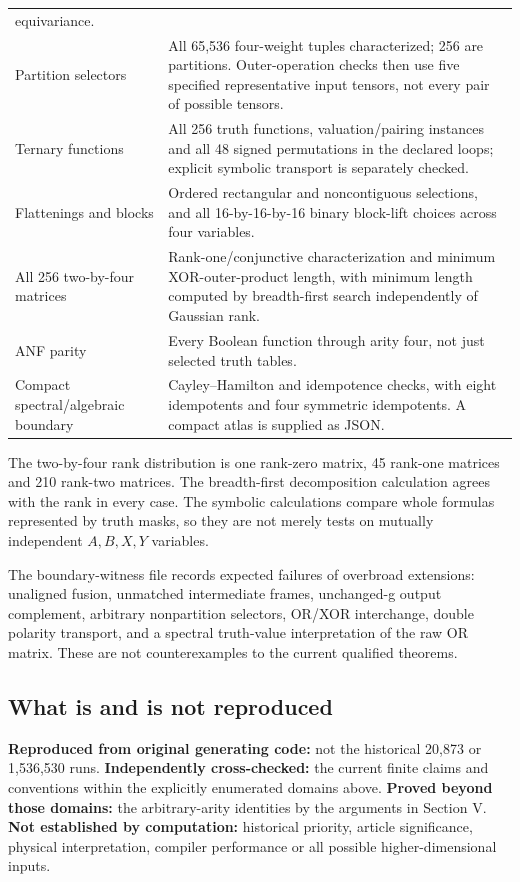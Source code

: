 \documentclass[
  10pt,
]{article}
\begin{document}
\begin{longtable}[]{@{}
  >{\raggedright\arraybackslash}p{}
  >{\raggedright\arraybackslash}p{}@{}}
equivariance. \\
Partition selectors & All 65,536 four-weight tuples characterized; 256
are partitions. Outer-operation checks then use five specified
representative input tensors, not every pair of possible tensors. \\
Ternary functions & All 256 truth functions, valuation/pairing instances
and all 48 signed permutations in the declared loops; explicit symbolic
transport is separately checked. \\
Flattenings and blocks & Ordered rectangular and noncontiguous
selections, and all 16-by-16-by-16 binary block-lift choices across four
variables. \\
All 256 two-by-four matrices & Rank-one/conjunctive characterization and
minimum XOR-outer-product length, with minimum length computed by
breadth-first search independently of Gaussian rank. \\
ANF parity & Every Boolean function through arity four, not just
selected truth tables. \\
Compact spectral/algebraic boundary & Cayley--Hamilton and idempotence
checks, with eight idempotents and four symmetric idempotents. A compact
atlas is supplied as JSON. \\
\end{longtable}

The two-by-four rank distribution is one rank-zero matrix, 45 rank-one
matrices and 210 rank-two matrices. The breadth-first decomposition
calculation agrees with the rank in every case. The symbolic
calculations compare whole formulas represented by truth masks, so they
are not merely tests on mutually independent \(A,B,X,Y\) variables.

The boundary-witness file records expected failures of overbroad
extensions: unaligned fusion, unmatched intermediate frames, unchanged-g
output complement, arbitrary nonpartition selectors, OR/XOR interchange,
double polarity transport, and a spectral truth-value interpretation of
the raw OR matrix. These are not counterexamples to the current
qualified theorems.

\subsection{What is and is not
reproduced}\label{what-is-and-is-not-reproduced}

\textbf{Reproduced from original generating code:} not the historical
20,873 or 1,536,530 runs. \textbf{Independently cross-checked:} the
current finite claims and conventions within the explicitly enumerated
domains above. \textbf{Proved beyond those domains:} the arbitrary-arity
identities by the arguments in Section V. \textbf{Not established by
computation:} historical priority, article significance, physical
interpretation, compiler performance or all possible higher-dimensional
inputs.
\end{document}
